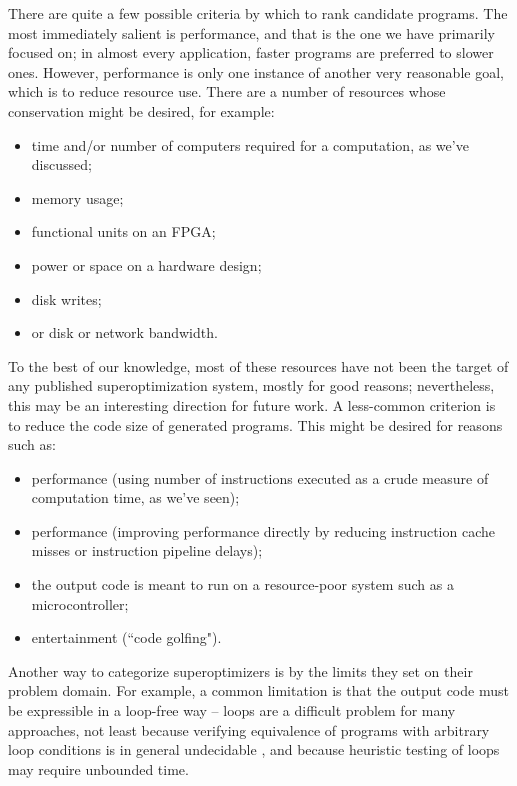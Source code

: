 \documentclass[12pt,twoside]{reedthesis}
\begin{document}
    There are quite a few possible criteria by which to rank candidate programs.
    The most immediately salient is performance, and that is the one we have primarily focused on;
    in almost every application, faster programs are preferred to slower ones.
    However, performance is only one instance of another very reasonable goal, which is to reduce resource use.
    There are a number of resources whose conservation might be desired, for example:
    \begin{itemize}
        \item time and/or number of computers required for a computation, as we've discussed;
        \item memory usage;
        \item functional units on an FPGA;
        \item power or space on a hardware design;
        \item disk writes;
        \item or disk or network bandwidth.
    \end{itemize}
    To the best of our knowledge, most of these resources have not been the target of any published superoptimization system, mostly for good reasons;
    nevertheless, this may be an interesting direction for future work.
    A less-common criterion is to reduce the code size of generated programs.
    This might be desired for reasons such as:
    \begin{itemize}
        \item performance (using number of instructions executed as a crude measure of computation time, as we've seen);
        \item performance (improving performance directly by reducing instruction cache misses or instruction pipeline delays);
        \item the output code is meant to run on a resource-poor system such as a microcontroller;
        \item entertainment (``code golfing").
    \end{itemize}
    
    Another way to categorize superoptimizers is by the limits they set on their problem domain.
    For example, a common limitation is that the output code must be expressible in a loop-free way
        -- loops are a difficult problem for many approaches, not least because verifying equivalence of programs with arbitrary loop conditions is in general undecidable \cite{turing1937tm} \cite{sipser2012computation}, and because heuristic testing of loops may require unbounded time.
    
\end{document}

